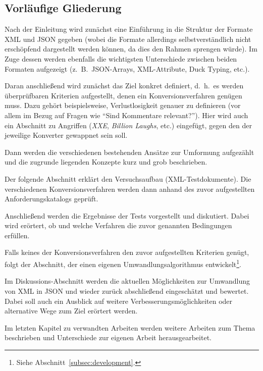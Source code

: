 \documentclass[conference]{template/IEEEtran}
\begin{document}
\subsection{Vorläufige Gliederung}
\label{subsec:structure}

Nach der Einleitung wird zunächst eine Einführung in die Struktur der
Formate XML und JSON gegeben (wobei die Formate allerdings selbstverständlich
nicht erschöpfend dargestellt werden können, da dies den Rahmen sprengen
würde). Im Zuge dessen werden ebenfalls die wichtigsten Unterschiede zwischen
beiden Formaten aufgezeigt (z.~B.\ JSON-Arrays, XML-Attribute, Duck Typing,
etc.).

Daran anschließend wird zunächst das Ziel konkret definiert, d.~h.\ es werden
überprüfbaren Kriterien aufgestellt, denen ein Konversionsverfahren genügen
muss. Dazu gehört beispielsweise, Verlustlosigkeit genauer zu definieren (vor
allem im Bezug auf Fragen wie \enquote{Sind Kommentare relevant?}). Hier wird
auch ein Abschnitt zu Angriffen (\emph{XXE}, \emph{Billion Laughs}, etc.)
eingefügt, gegen den der jeweilige Konverter gewappnet sein soll.

Dann werden die verschiedenen bestehenden Ansätze zur Umformung aufgezählt
und die zugrunde liegenden Konzepte kurz und grob beschrieben.

Der folgende Abschnitt erklärt den Versuchsaufbau (XML-Testdokumente).
Die verschiedenen Konversionsverfahren werden dann anhand des zuvor
aufgestellten Anforderungskatalogs geprüft.

Anschließend werden die Ergebnisse der Tests vorgestellt und diskutiert.
Dabei wird erörtert, ob und welche Verfahren die zuvor genannten Bedingungen
erfüllen.

Falls keines der Konversionsverfahren den zuvor aufgestellten Kriterien genügt,
folgt der Abschnitt, der einen eigenen Umwandlungsalgorithmus
entwickelt\footnote{Siehe Abschnitt~\ref{subsec:development}.}.

Im Diskussions-Abschnitt werden die aktuellen Möglichkeiten zur Umwandlung
von XML in JSON und wieder zurück abschließend eingeschätzt und bewertet.
Dabei soll auch ein Ausblick auf weitere Verbesserungsmöglichkeiten oder
alternative Wege zum Ziel erörtert werden.

Im letzten Kapitel zu verwandten Arbeiten werden weitere Arbeiten zum Thema
beschrieben und Unterschiede zur eigenen Arbeit herausgearbeitet.


\ifCLASSOPTIONcaptionsoff{}
  \newpage
\fi
\printbibliography{}
\end{document}
